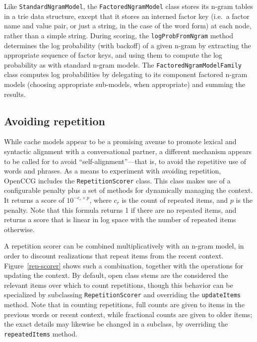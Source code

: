 \documentclass[11pt]{article}
\newcommand{\code}[1]{\texttt{#1}} %
\begin{document}
Like \code{Standard\-Ngram\-Model}, the \code{Factored\-Ngram\-Model} class
stores its n-gram tables in a trie data structure, except that it stores
an interned factor key (i.e.\ a factor name and value pair, or just a
string, in the case of the word form) at each node, rather than a simple
string. During scoring, the \code{log\-Prob\-From\-Ngram} method determines
the log probability (with backoff) of a given n-gram by extracting the
appropriate sequence of factor keys, and using them to compute the log
probability as with standard n-gram models. The
\code{Factored\-Ngram\-Model\-Family} class computes log probabilities by
delegating to its component factored n-gram models (choosing appropriate
sub-models, when appropriate) and summing the results.
 
\subsection{Avoiding repetition}

While cache models appear to be a promising avenue to promote lexical
and syntactic alignment with a conversational partner, a different
mechanism appears to be called for to avoid ``self-alignment''---that
is, to avoid the repetitive use of words and phrases. As a means to
experiment with avoiding repetition, OpenCCG includes the
\code{Repetition\-Scorer} class. This class makes use of a configurable
penalty plus a set of methods for dynamically managing the context. It
returns a score of \( 10^{- c_r \times p} \), where $c_r$ is the count
of repeated items, and $p$ is the penalty. Note that this formula
returns 1 if there are no repeated items, and returns a score that is
linear in log space with the number of repeated items otherwise.

A repetition scorer can be combined multiplicatively with an n-gram
model, in order to discount realizations that repeat items from the
recent context. Figure~\ref{rep-scorer} shows such a combination,
together with the operations for updating the context. By default, open
class stems are the considered the relevant items over which to count
repetitions, though this behavior can be specialized by subclassing
\code{Repetition\-Scorer} and overriding the \code{updateItems} method.
Note that in counting repetitions, full counts are given to items in the
previous words or recent context, while fractional counts are given to
older items; the exact details may likewise be changed in a subclass, by
overriding the \code{repeatedItems} method.
\end{document}
